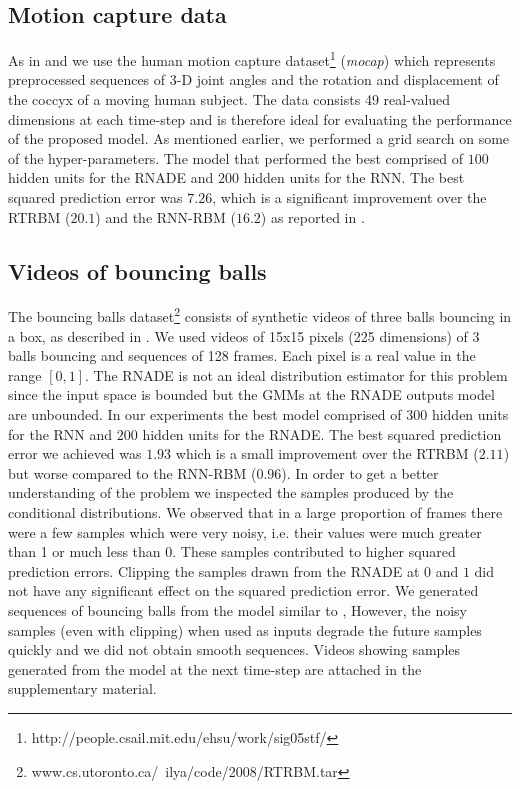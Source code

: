 \documentclass{article} %
\begin{document}
\subsection{Motion capture data}
As in \cite{Sutskever2008} and \cite{Boulanger-Lewandowski2012} we use the human motion capture dataset\footnote{http://people.csail.mit.edu/ehsu/work/sig05stf/} ({\it mocap}) which represents preprocessed sequences of 3-D joint angles and the rotation and displacement of the coccyx of a moving human subject. The data consists 49 real-valued dimensions at each time-step and is therefore ideal for evaluating the performance of the proposed model. As mentioned earlier, we performed a grid search on some of the hyper-parameters. The model that performed the best comprised of $100$ hidden units for the RNADE and $200$ hidden units for the RNN. The best squared prediction error was $\mathbf{7.26}$, which is a significant improvement over the RTRBM ($20.1$) and the RNN-RBM ($16.2$) as reported in \cite{Boulanger-Lewandowski2012}. 

\subsection{Videos of bouncing balls}
The bouncing balls dataset\footnote{www.cs.utoronto.ca/~ilya/code/2008/RTRBM.tar} consists of synthetic videos of three balls bouncing in a box, as described in \cite{Sutskever2008}. We used videos of 15x15 pixels (225 dimensions) of 3 balls bouncing and sequences of 128 frames. Each pixel is a real value in the range $[0,1]$. The RNADE is not an ideal distribution estimator for this problem since the input space is bounded but the GMMs at the RNADE outputs model are unbounded. In our experiments the best model comprised of $300$ hidden units for the RNN and $200$ hidden units for the RNADE. The best squared prediction error we achieved was $1.93$ which is a small improvement over the RTRBM ($2.11$) but worse compared to the RNN-RBM ($0.96$). In order to get a better understanding of the problem we inspected the samples produced by the conditional distributions. We observed that in a large proportion of frames there were a few samples which were very noisy, i.e. their values were much greater than 1 or much less than 0. These samples contributed to higher squared prediction errors. Clipping the samples drawn from the RNADE at $0$ and $1$ did not have any significant effect on the squared prediction error. We generated sequences of bouncing balls from the model similar to \cite{Sutskever2008}, However, the noisy samples (even with clipping) when used as inputs degrade the future samples quickly and we did not obtain smooth sequences. Videos showing samples generated from the model at the next time-step are attached in the supplementary material.
\end{document}
